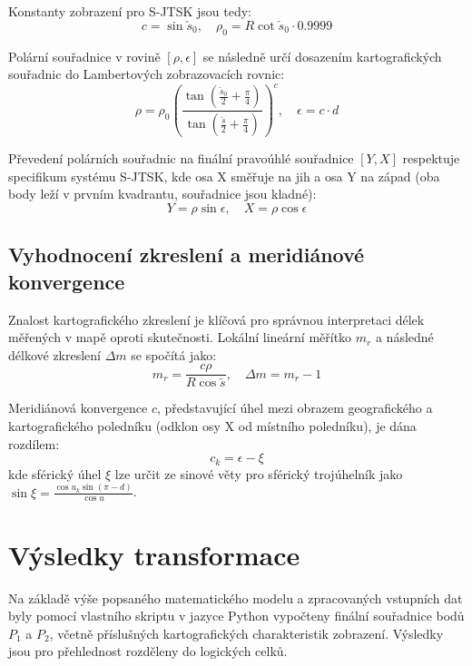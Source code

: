 \documentclass[12pt, a4paper]{article}
\begin{document}
Konstanty zobrazení pro S-JTSK jsou tedy:
\begin{equation}
    c = \sin \check{s}_0, \quad \rho_0 = R \cot \check{s}_0 \cdot 0.9999
\end{equation}

Polární souřadnice v rovině $[\rho, \epsilon]$ se následně určí dosazením kartografických souřadnic do Lambertových zobrazovacích rovnic:
\begin{equation}
    \rho = \rho_0 \left( \frac{\tan\left(\frac{\check{s}_0}{2} + \frac{\pi}{4}\right)}{\tan\left(\frac{\check{s}}{2} + \frac{\pi}{4}\right)} \right)^c, \quad \epsilon = c \cdot d
\end{equation}

Převedení polárních souřadnic na finální pravoúhlé souřadnice $[Y, X]$ respektuje specifikum systému S-JTSK, kde osa X směřuje na jih a osa Y na západ (oba body leží v prvním kvadrantu, souřadnice jsou kladné):
\begin{equation}
    Y = \rho \sin \epsilon, \quad X = \rho \cos \epsilon
\end{equation}

\subsection{Vyhodnocení zkreslení a meridiánové konvergence}
Znalost kartografického zkreslení je klíčová pro správnou interpretaci délek měřených v mapě oproti skutečnosti. Lokální lineární měřítko $m_r$ a následné délkové zkreslení $\Delta m$ se spočítá jako:
\begin{equation}
    m_r = \frac{c \rho}{R \cos \check{s}}, \quad \Delta m = m_r - 1
\end{equation}

Meridiánová konvergence $c$, představující úhel mezi obrazem geografického a kartografického poledníku (odklon osy X od místního poledníku), je dána rozdílem:
\begin{equation}
    c_k = \epsilon - \xi
\end{equation}
kde sférický úhel $\xi$ lze určit ze sinové věty pro sférický trojúhelník jako $\sin \xi = \frac{\cos u_k \sin(\pi - d)}{\cos u}$.


\clearpage
\newpage

\section{Výsledky transformace}
Na základě výše popsaného matematického modelu a zpracovaných vstupních dat byly pomocí vlastního skriptu v jazyce Python vypočteny finální souřadnice bodů $P_1$ a $P_2$, včetně příslušných kartografických charakteristik zobrazení. Výsledky jsou pro přehlednost rozděleny do logických celků.
\end{document}
